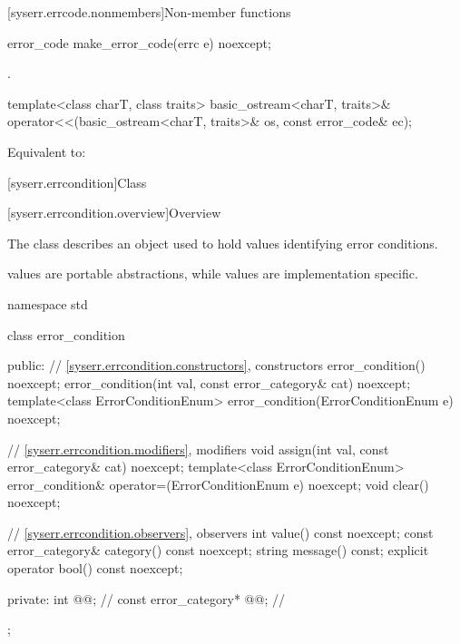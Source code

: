 [syserr.errcode.nonmembers]{Non-member functions}

%
\begin{itemdecl}
error_code make_error_code(errc e) noexcept;
\end{itemdecl}

\begin{itemdescr}
\pnum
\returns
{}.
\end{itemdescr}

%
\begin{itemdecl}
template<class charT, class traits>
  basic_ostream<charT, traits>& operator<<(basic_ostream<charT, traits>& os, const error_code& ec);
\end{itemdecl}

\begin{itemdescr}
\pnum
\effects
Equivalent to: 
\end{itemdescr}


[syserr.errcondition]{Class }

[syserr.errcondition.overview]{Overview}

\pnum
The class  describes an object used to hold values identifying
error conditions.
\begin{note}
 values are portable abstractions,
while  values are implementation specific.
\end{note}

%
\begin{codeblock}
namespace std {
  class error_condition {
  public:
    // \ref{syserr.errcondition.constructors}, constructors
    error_condition() noexcept;
    error_condition(int val, const error_category& cat) noexcept;
    template<class ErrorConditionEnum>
      error_condition(ErrorConditionEnum e) noexcept;

    // \ref{syserr.errcondition.modifiers}, modifiers
    void assign(int val, const error_category& cat) noexcept;
    template<class ErrorConditionEnum>
      error_condition& operator=(ErrorConditionEnum e) noexcept;
    void clear() noexcept;

    // \ref{syserr.errcondition.observers}, observers
    int value() const noexcept;
    const error_category& category() const noexcept;
    string message() const;
    explicit operator bool() const noexcept;

  private:
    int @@;                   // \expos
    const error_category* @@; // \expos
  };
}
\end{codeblock}

